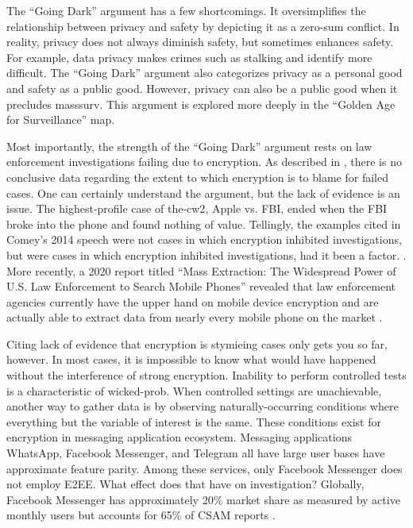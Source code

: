 The ``Going Dark'' argument has a few shortcomings. It oversimplifies the relationship between privacy and safety by
depicting it as a zero-sum conflict. In reality, privacy does not always diminish safety, but sometimes enhances safety.
For example, data privacy makes crimes such as stalking and identify more difficult. The ``Going Dark'' argument also
categorizes privacy as a personal good and safety as a public good. However, privacy can also be a public good when it
precludes \ac{masssurv}. This argument is explored more deeply in the ``Golden Age for Surveillance'' map.

Most importantly, the strength of the ``Going Dark'' argument rests on law enforcement investigations failing due to
encryption. As described in , there is no conclusive data regarding the extent to which
encryption is to blame for failed cases. One can certainly understand the argument, but the lack of evidence is an
issue. The highest-profile case of \ac{the-cw2}, Apple vs. FBI, ended when the \ac{FBI} broke into the phone and found
nothing of value. Tellingly, the examples cited in Comey's 2014 speech were not cases in which encryption inhibited
investigations, but were cases in which encryption  inhibited investigations, had it been a factor.
\cite{comey_2014}. More recently, a 2020 report titled ``Mass Extraction: The Widespread Power of U.S. Law Enforcement
to Search Mobile Phones'' revealed that law enforcement agencies currently have the upper hand on mobile device
encryption and are actually able to extract data from nearly every mobile phone on the market \cite{koepke_2020}.

Citing lack of evidence that encryption is stymieing cases only gets you so far, however. In most cases, it is
impossible to know what would have happened without the interference of strong encryption. Inability to perform
controlled tests is a characteristic of \ac{wicked-prob}. When controlled settings are unachievable, another way to
gather data is by observing naturally-occurring conditions where everything but the variable of interest is the same.
These conditions exist for encryption in messaging application ecosystem. Messaging applications WhatsApp, Facebook
Messenger, and Telegram all have large user bases have approximate feature parity. Among these services, only Facebook
Messenger does not employ \ac{E2EE}. What effect does that have on investigation? Globally, Facebook Messenger has
approximately 20\% market share as measured by active monthly users \cite{statista_2020} but accounts for 65\% of
\ac{CSAM} reports \cite{keller_internet_2019}.

